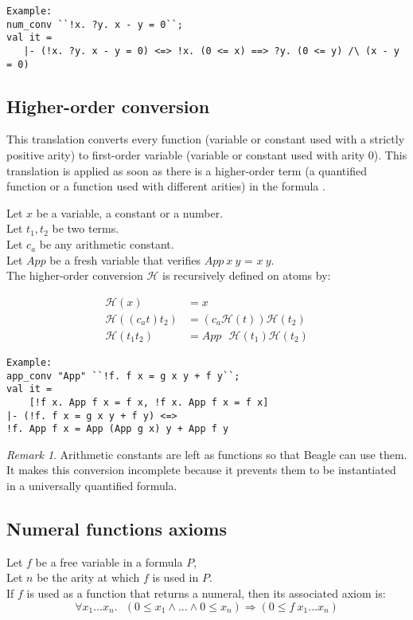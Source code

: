 \documentclass[a4paper, 11pt]{article}
\theoremstyle{plain}
\theoremstyle{definition}
\theoremstyle{remark}
\newtheorem*{remark}{Remark}
\begin{document}
\scriptsize
\begin{Verbatim}[frame=single]
Example:
num_conv ``!x. ?y. x - y = 0``;
val it =
   |- (!x. ?y. x - y = 0) <=> !x. (0 <= x) ==> ?y. (0 <= y) /\ (x - y = 0)
\end{Verbatim} 
\normalsize

\subsection{Higher-order conversion}
This translation converts every function (variable or constant used with a strictly positive arity) to first-order variable (variable or constant used with arity 0). This translation is applied as soon as there is a higher-order term (a quantified function or a function used with different arities) in the formula .

Let $x$ be a variable, a constant or a number.
\\Let $t_1,t_2$ be two terms.
\\Let $c_a$ be any arithmetic constant.
\\Let $App$ be a fresh variable that verifies $App\ x\ y$ = $x\ y$.
\\The higher-order conversion $\mathcal{H}$ is recursively defined on atoms by:

\[\begin{aligned}
 \mathcal{H}(x) &= x \\
\mathcal{H}((c_a t) t_2) &=  (c_a \mathcal{H}(t)) \mathcal{H}(t_2)    \\
\mathcal{H} (t_1 t_2) &= App\mbox{ } \mathcal{H} (t_1)
\mathcal{H} (t_2)
\end{aligned}\]

\scriptsize
\begin{Verbatim}[frame=single]
Example:
app_conv "App" ``!f. f x = g x y + f y``;
val it =
    [!f x. App f x = f x, !f x. App f x = f x]
|- (!f. f x = g x y + f y) <=> 
!f. App f x = App (App g x) y + App f y
\end{Verbatim} 
\normalsize

\begin{remark}
Arithmetic constants are left as functions so that Beagle can use them. It makes this conversion incomplete because it prevents them to be instantiated in a universally quantified formula.
\end{remark}

\subsection{Numeral functions axioms}
Let $f$ be a free variable in a formula $P$, 
\\Let $n$ be the arity at which $f$ is used in $P$.
\\If $f$ is used as a function that returns a numeral, then its associated axiom is:
  \[ \forall x_1 \ldots x_n.\mbox{ } ( 0 \leq x_1 \wedge \ldots \wedge 0 \leq x_n) \Rightarrow (0 \leq f\ x_1 \ldots x_n)
  \]  
\end{document}
